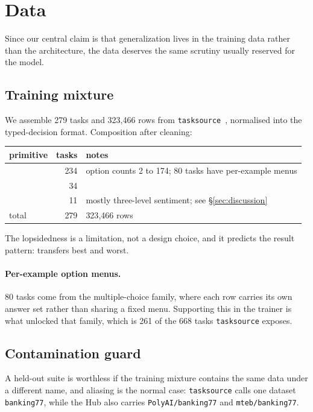 \section{Data}
\label{sec:data}

Since our central claim is that generalization lives in the training data
rather than the architecture, the data deserves the same scrutiny usually
reserved for the model.

\subsection{Training mixture}

We assemble 279 tasks and 323{,}466 rows from
\texttt{tasksource}~\cite{tasksource}, normalised into the typed-decision
format. Composition after cleaning:

\begin{center}
\begin{tabular}{lrl}
\toprule
primitive & tasks & notes \\
\midrule
\choice{} & 234 & option counts 2 to 174; 80 tasks have per-example menus \\
\noul{}   & 34  & \\
\score{}  & 11  & mostly three-level sentiment; see \S\ref{sec:discussion} \\
\midrule
total & 279 & 323{,}466 rows \\
\bottomrule
\end{tabular}
\end{center}

The lopsidedness is a limitation, not a design choice, and it predicts the
result pattern: \choice{} transfers best and \score{} worst.

\paragraph{Per-example option menus.} 80 tasks come from the
multiple-choice family, where each row carries its own answer set rather
than sharing a fixed menu. Supporting this in the trainer is what unlocked
that family, which is 261 of the 668 tasks \texttt{tasksource} exposes.

\subsection{Contamination guard}

A held-out suite is worthless if the training mixture contains the same
data under a different name, and aliasing is the normal case:
\texttt{tasksource} calls one dataset \texttt{banking77}, while the Hub
also carries \texttt{PolyAI/banking77} and \texttt{mteb/banking77}.

